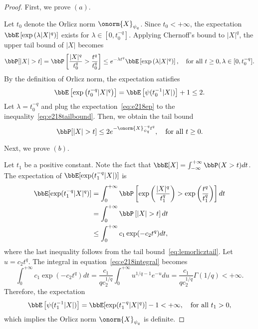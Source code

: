 \documentclass[11pt]{article}
\newcommand{\of}[1]{\left(#1\right)}
\newcommand{\off}[1]{\left[#1\right]}
\theoremstyle{plain}
\theoremstyle{definition}
\begin{document}
    \begin{proof}
    	First, we prove $(a)$.
    	
    	\vspace{0.2cm}
    	
    	Let $t_0$ denote the Orlicz norm $\onorm{X}_{\psi_q}$. Since $t_0 < +\infty$, the expectation $ \bbE \off{ \exp \of{\lambda |X|^q} }$ exists for $\lambda \in  [0,t^{-q}_0]$. Applying Chernoff's bound to $|X|^q$, the upper tail bound of $|X|$ becomes
    	\begin{equation}\label{eq:e218tailbound}
    		\bbP [|X|>t] = \bbP \off{\frac{|X|^q}{t^q_0} > \frac{t^q}{t^q_0}} \leq e^{-\lambda t^q} \bbE \off{ \exp \of{\lambda |X|^q} }, \quad \text{for all } t\geq 0, \lambda\in [0,t^{-q}_0].
    	\end{equation}
    	 By the definition of Orlicz norm, the expectation satisfies
    	\begin{equation}\label{eq:e218ep}
    		\bbE \off{ \exp \of{ t^{-q}_0|X|^q} } = \bbE \off{ \psi( t^{-1}_0 |X| )} + 1 \leq 2.
    	\end{equation}
    	Let $\lambda = t^{-q}_0$ and plug the expectation~\eqref{eq:e218ep} to the inequality~\eqref{eq:e218tailbound}. Then, we obtain the tail bound
    	\begin{equation}
    		\bbP [|X|>t] \leq 2 e^{- \onorm{X}^{-q}_{\psi_q} t^q },\quad 
    		\text{for all }  t \geq 0.
    	\end{equation}
    	
    	\vspace{0.2cm}
    	Next, we prove $(b)$.
    	
    	\vspace{0.2cm}
     Let $t_1$ be a positive constant. 	Note the fact that $\bbE[X] = \int_{-\infty}^{+\infty} \bbP(X >t) dt  $. The expectation of $\bbE[ \exp(t^{-q}_1 |X| )  ]$ is
    	\begin{align}
    		\bbE[ \exp(t^{-q}_1 |X|^q )  ] &= \int_{0}^{+\infty} \bbP \off{ \exp \of{\frac{|X|^q}{t^q_1}} > \exp \of{\frac{t^q}{t^q_1}} } dt \\
    		& = \int_{0}^{+\infty} \bbP \off{ |X| > t } dt \\
    		& \leq  \int_{0}^{+\infty} c_1 \exp(-c_2 t^q) dt\label{eq:e218integral},
       	\end{align}
       	where the last inequality follows from the tail bound~\eqref{eq:lemorlicztail}. Let $u = c_2 t^q$. The integral in equation~\eqref{eq:e218integral} becomes
       	\[  \int_{0}^{+\infty} c_1 \exp(-c_2 t^q) dt = \frac{c_1}{q c_2^{1/q}} \int_{0}^{+\infty} u^{1/q-1}e^{-u} du =  \frac{c_1}{q c_2^{1/q}} \Gamma(1/q) < +\infty.  \]
       	Therefore, the expectation 
       	\begin{equation}
       		\bbE \off{ \psi(t_1^{-1} |X| )} =  \bbE[ \exp(t^{-q}_1 |X|^q )  ] - 1 < +\infty, \quad \text{for all } t_1 > 0,
       	\end{equation}
       	which implies the Orlicz norm $\onorm{X}_{\psi_q}$ is definite.
    \end{proof}
    
\end{document}
